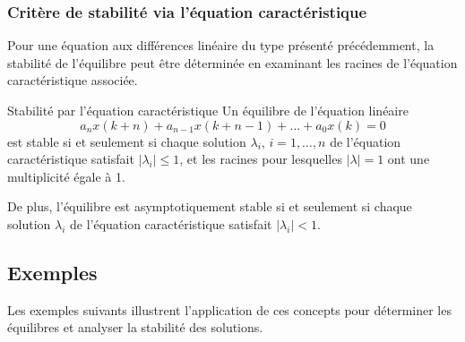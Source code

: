             \subsubsection{Critère de stabilité via l'équation caractéristique}
                Pour une équation aux différences linéaire du type présenté précédemment, la stabilité de l'équilibre peut être déterminée en examinant les racines de l'équation caractéristique associée.
                \begin{theorem}{Stabilité par l'équation caractéristique}
                    Un équilibre de l'équation linéaire 
                    \begin{equation}
                        a_n x(k+n)+a_{n-1} x(k+n-1)+\dots+a_0 x(k) = 0
                    \end{equation}
                    est stable si et seulement si chaque solution $\lambda_i$, $i=1, \dots, n$ de l'équation caractéristique satisfait $|\lambda_i| \leq 1$, et les racines pour lesquelles $|\lambda| = 1$ ont une multiplicité égale à 1.
                
                    De plus, l'équilibre est asymptotiquement stable si et seulement si chaque solution $\lambda_i$ de l'équation caractéristique satisfait $|\lambda_i| < 1$.
                \end{theorem}

        \subsection{Exemples}
            Les exemples suivants illustrent l'application de ces concepts pour déterminer les équilibres et analyser la stabilité des solutions.
